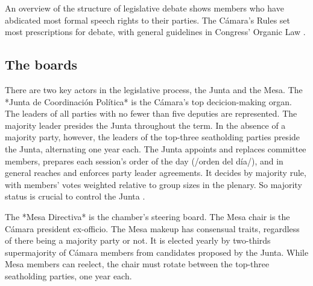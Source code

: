 \documentclass[letter,12pt]{article}
\begin{document}


An overview of the structure of legislative debate shows members who have abdicated most formal speech rights to their parties. The Cámara's Rules \citep{reglamentoDipMx.2019} set most prescriptions for debate, with general guidelines in Congress' Organic Law \citep{loceum.2019}.

  \subsection{The boards}
There are two key actors in the legislative process, the Junta and the Mesa. The *Junta de Coordinación Política* is the Cámara's top decicion-making organ. The leaders of all parties with no fewer than five deputies are represented. The majority leader presides the Junta throughout the term. In the absence of a majority party, however, the leaders of the top-three seatholding parties preside the Junta, alternating one year each. The Junta appoints and replaces committee members, prepares each session's order of the day (/orden del día/), and in general reaches and enforces party leader agreements. It decides by majority rule, with members' votes weighted relative to group sizes in the plenary. So majority status is crucial to control the Junta \citep[cf.][]{cox.mccubbins.2005}.

The *Mesa Directiva* is the chamber's steering board. The Mesa chair is the Cámara president ex-officio. The Mesa makeup has consensual traits, regardless of there being a majority party or not. It is elected yearly by two-thirds supermajority of Cámara members from candidates proposed by the Junta. While Mesa members can reelect, the chair must rotate between the top-three seatholding parties, one year each. 
\end{document}
